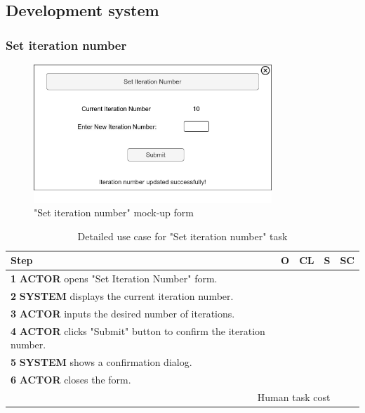 \subsection{Development system}

\subsubsection{Set iteration number}

\begin{figure}[H]
\centering
\includegraphics[width=0.8\textwidth]{figures/set_iteration_number.png}
\caption{"Set iteration number" mock-up form}
\end{figure}

\begin{table}[H]
\centering
\begin{tabular}{|l|c|c|c|c|}
\hline
\textbf{Step} & \textbf{O} & \textbf{CL} & \textbf{S} & \textbf{SC} \\
\hline
\textbf{1} \textbf{ACTOR} opens "Set Iteration Number" form. & & & & \\
\hline
\textbf{2} \textbf{SYSTEM} displays the current iteration number. & & & & \\
\hline
\textbf{3} \textbf{ACTOR} inputs the desired number of iterations. & & & & \\
\hline
\textbf{4} \textbf{ACTOR} clicks "Submit" button to confirm the iteration number. & & & & \\
\hline
\textbf{5} \textbf{SYSTEM} shows a confirmation dialog. & & & & \\
\hline
\textbf{6} \textbf{ACTOR} closes the form. & & & & \\
\hline
\multicolumn{4}{|r|}{Human task cost} & \\
\hline
\end{tabular}
\caption{Detailed use case for "Set iteration number" task}
\label{table:set_iteration_number}
\end{table}

